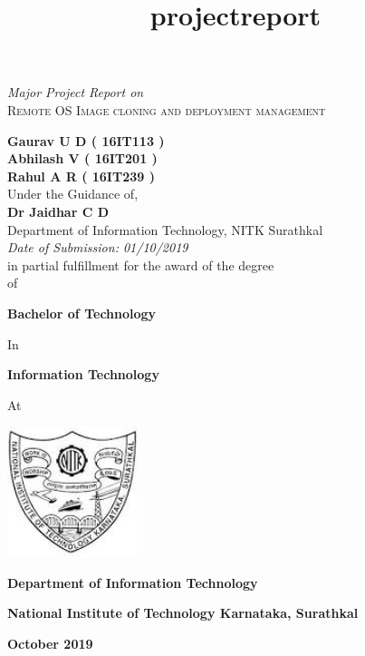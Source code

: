 \documentclass[a4paper,12pt]{article}
\title{projectreport}
\begin{document}
\thispagestyle{empty}
\begin{center}
\textit{Major Project Report on} \\
\vspace{2 mm}
\Large{\textsc{ Remote OS Image cloning and  deployment management }}   %

\vspace{7 mm}
\large{\textbf{                  %
Gaurav U D ( 16IT113 )  
\\Abhilash V ( 16IT201 )   
\\Rahul A R ( 16IT239 ) 
}}
\\
\vspace{4 mm}
Under the Guidance of,\\
\textbf{Dr Jaidhar C D}\\         %
Department of Information Technology, NITK Surathkal\\
\vspace{4 mm}
\textit{Date of Submission: 01/10/2019}
\\
\vspace{4 mm}
in partial fulfillment for the award of the degree
\\

of

\textbf{Bachelor of Technology}

In

\textbf{Information Technology}

At
\vspace{4 mm}
	
		\includegraphics[width=1.5in,height=1.5in]
		{nitk.jpg}
 
\textbf{Department of Information Technology}

\textbf{National Institute of Technology Karnataka, Surathkal}

\textbf{October 2019}
\end{center}

\newpage
\end{document}
